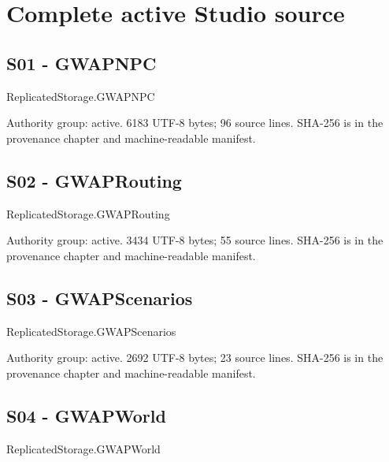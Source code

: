 \part{Complete active Studio source}
\chapter{S01 - GWAPNPC}
\label{src:S01}
ReplicatedStorage.\allowbreak{}GWAPNPC

Authority group: active.\allowbreak{} 6183 UTF-8 bytes; 96 source lines.\allowbreak{} SHA-256 is in the provenance chapter and machine-readable manifest.\allowbreak{}

\begingroup{}
\endgroup
\chapter{S02 - GWAPRouting}
\label{src:S02}
ReplicatedStorage.\allowbreak{}GWAPRouting

Authority group: active.\allowbreak{} 3434 UTF-8 bytes; 55 source lines.\allowbreak{} SHA-256 is in the provenance chapter and machine-readable manifest.\allowbreak{}

\begingroup{}
\endgroup
\chapter{S03 - GWAPScenarios}
\label{src:S03}
ReplicatedStorage.\allowbreak{}GWAPScenarios

Authority group: active.\allowbreak{} 2692 UTF-8 bytes; 23 source lines.\allowbreak{} SHA-256 is in the provenance chapter and machine-readable manifest.\allowbreak{}

\begingroup{}
\endgroup
\chapter{S04 - GWAPWorld}
\label{src:S04}
ReplicatedStorage.\allowbreak{}GWAPWorld

